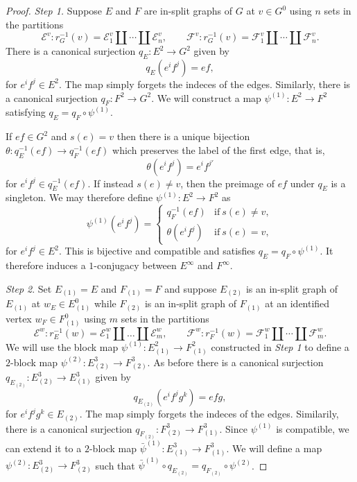 \documentclass[12pt,a4paper,oneside,reqno,final]{amsart}
\newcommand{\LRA}{\longrightarrow}
\newcommand{\E}{\mathcal{E}}
\newcommand{\F}{\mathcal{F}}
\theoremstyle{definition}
\numberwithin{equation}{section} %
\begin{document}
\begin{proof}
  \emph{Step 1.}
    Suppose $E$ and $F$ are in-split graphs of $G$ at $v\in G^0$ using $n$ sets in the partitions
    \[
        \E^v: r_G^{-1}(v) = \E^v_1 \amalg \cdots \amalg \E^v_n, \qquad
        \F^v: r_G^{-1}(v) = \F^v_1 \amalg \cdots \amalg \F^v_n.
    \]
    There is a canonical surjection $q_{E}\colon E^2 \LRA G^2$ given by
    \[
        q_E(e^i f^j) = e f,
    \]
    for $e^i f^j\in E^2$.
    The map simply forgets the indeces of the edges.
    Similarly, there is a canonical surjection $q_F\colon F^2\LRA G^2$.
    We will construct a map $\psi^{(1)}\colon E^2\LRA F^2$ satisfying $q_E = q_F\circ \psi^{(1)}$.

    If $e f\in G^2$ and $s(e) = v$ then there is a unique bijection $\theta\colon q_E^{-1}(e f) \LRA q_F^{-1}(e f)$ which preserves the label of the first edge, that is,
    \[
        \theta(e^i f^j) = e^i f^{j'}
    \]
    for $e^i f^j\in q_E^{-1}(e f)$.
    If instead $s(e) \neq v$, then the preimage of $e f$ under $q_E$ is a singleton.
    We may therefore define $\psi^{(1)}\colon E^2 \LRA F^2$ as
    \[
        \psi^{(1)}(e^i f^j) = 
        \begin{cases}
            q_F^{-1}(e f) & \textrm{if}~s(e) \neq v, \\
            \theta(e^i f^j) & \textrm{if}~s(e) = v,
        \end{cases}
    \]
    for $e^i f^j \in E^2$.
    This is bijective and compatible and satisfies $q_E = q_F\circ \psi^{(1)}$.
    It therefore induces a $1$-conjugacy between $E^\infty$ and $F^\infty$.
   
    
    \emph{Step 2}.
    Set $E_{(1)} = E$ and $F_{(1)} = F$ and suppose $E_{(2)}$ is an in-split graph of $E_{(1)}$ at $w_E\in E_{(1)}^0$ 
    while $F_{(2)}$ is an in-split graph of $F_{(1)}$ at an identified vertex $w_F\in F_{(1)}^0$ using $m$ sets in the partitions
    \[
        \E^w: r_E^{-1}(w) = \E^{w}_1 \amalg \dots \amalg \E^{w}_m, \qquad
        \F^w: r_F^{-1}(w) = \F^{w}_1 \amalg \cdots \amalg \F^{w}_m.
    \]
    We will use the block map $\psi^{(1)}\colon E_{(1)}^2 \LRA F_{(1)}^2$ constructed in \emph{Step 1} to define a $2$-block map $\psi^{(2)}\colon E_{(2)}^3 \LRA F_{(2)}^3$.
    As before there is a canonical surjection $q_{E_{(2)}}\colon E_{(2)}^3 \LRA E_{(1)}^3$ given by
    \[
      q_{E_{(2)}} (e^i f^j g^k) = e f g,
    \]
    for $e^i f^j g^k\in E_{(2)}$.
    The map simply forgets the indeces of the edges.
    Similarily, there is a canonical surjection $q_{F_{(2)}}\colon F_{(2)}^3\LRA F_{(1)}^3$.
    Since $\psi^{(1)}$ is compatible, we can extend it to a $2$-block map $\bar{\psi}^{(1)}\colon E_{(1)}^3 \LRA F_{(1)}^3$.
    We will define a map $\psi^{(2)}\colon E_{(2)}^3\LRA F_{(2)}^3$ such that $\bar{\psi}^{(1)}\circ q_{E_{(2)}} = q_{F_{(2)}}\circ \psi^{(2)}$.


\end{proof}
\end{document}
